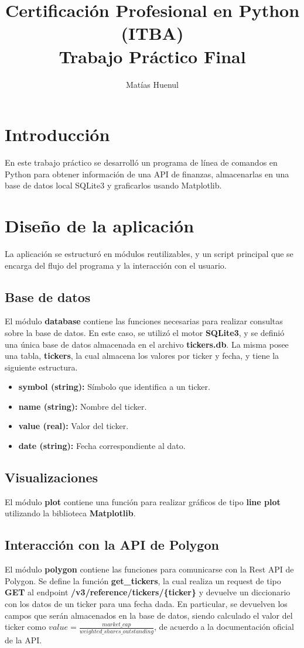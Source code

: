 \documentclass{article}
\title{Certificación Profesional en Python (ITBA) \\
Trabajo Práctico Final}
\author{Matías Huenul}
\date{}
\begin{document}
\maketitle
\tableofcontents
\newpage

\section{Introducción}
En este trabajo práctico se desarrolló un programa de línea de comandos en Python para
obtener información de una API de finanzas, almacenarlas en una base de datos local SQLite3
y graficarlos usando Matplotlib.

\section{Diseño de la aplicación}
La aplicación se estructuró en módulos reutilizables, y un script principal que se encarga
del flujo del programa y la interacción con el usuario.

\subsection{Base de datos}
El módulo \textbf{database} contiene las funciones necesarias para realizar consultas
sobre la base de datos. En este caso, se utilizó el motor \textbf{SQLite3},
y se definió una única base de datos almacenada en el archivo \textbf{tickers.db}.
La misma posee una tabla, \textbf{tickers}, la cual almacena los valores por ticker y fecha, y
tiene la siguiente estructura.

\begin{itemize}
    \item \textbf{symbol (string):} Símbolo que identifica a un ticker.
    \item \textbf{name (string):} Nombre del ticker.
    \item \textbf{value (real):} Valor del ticker.
    \item \textbf{date (string):} Fecha correspondiente al dato.
\end{itemize}

\subsection{Visualizaciones}
El módulo \textbf{plot} contiene una función para realizar gráficos de tipo \textbf{line plot}
utilizando la biblioteca \textbf{Matplotlib}.

\subsection{Interacción con la API de Polygon}
El módulo \textbf{polygon} contiene las funciones para comunicarse con la Rest API de Polygon.
Se define la función \textbf{get\_tickers}, la cual realiza un request
de tipo \textbf{GET} al endpoint \textbf{/v3/reference/tickers/\{ticker\}} y devuelve un diccionario con
los datos de un ticker para una fecha dada. En particular, se devuelven los campos que serán
almacenados en la base de datos, siendo calculado el valor del ticker
como $value = \frac{market\_cap}{weighted\_shares\_outstanding}$, de acuerdo a la documentación oficial
de la API.
\end{document}
